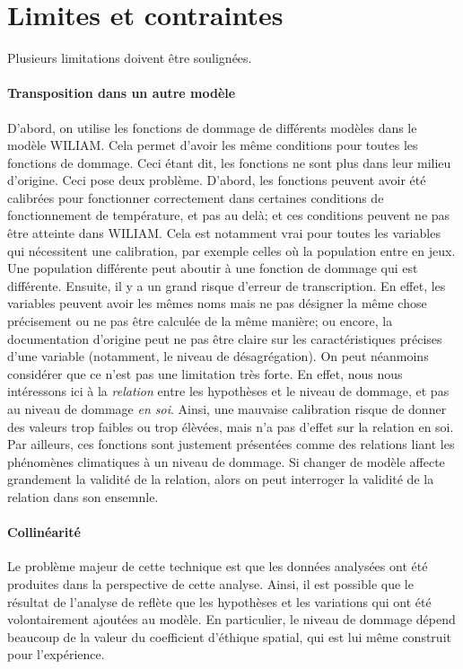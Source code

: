 \section{Limites et contraintes}

Plusieurs limitations doivent être soulignées. 

\paragraph{Transposition dans un autre modèle} D'abord, on utilise les fonctions de dommage de différents modèles dans le modèle WILIAM. Cela permet d'avoir les même conditions pour toutes les fonctions de dommage. Ceci étant dit, les fonctions ne sont plus dans leur milieu d'origine. Ceci pose deux problème. D'abord, les fonctions peuvent avoir été calibrées pour fonctionner correctement dans certaines conditions de fonctionnement de température, et pas au delà; et ces conditions peuvent ne pas être atteinte dans WILIAM. Cela est notamment vrai pour toutes les variables qui nécessitent une calibration, par exemple celles où la population entre en jeux. Une population différente peut aboutir à une fonction de dommage qui est différente. Ensuite, il y a un grand risque d'erreur de transcription. En effet, les variables peuvent avoir les mêmes noms mais ne pas désigner la même chose précisement ou ne pas être calculée de la même manière; ou encore, la documentation d'origine peut ne pas être claire sur les caractéristiques précises d'une variable (notamment, le niveau de désagrégation). On peut néanmoins considérer que ce n'est pas une limitation très forte. En effet, nous nous intéressons ici à la \emph{relation} entre les hypothèses et le niveau de dommage, et pas au niveau de dommage \emph{en soi}. Ainsi, une mauvaise calibration risque de donner des valeurs trop faibles ou trop élèvées, mais n'a pas d'effet sur la relation en soi. Par ailleurs, ces fonctions sont justement présentées comme des relations liant les phénomènes climatiques à un niveau de dommage. Si changer de modèle affecte grandement la validité de la relation, alors on peut interroger la validité de la relation dans son ensemnle. 

\paragraph{Collinéarité} Le problème majeur de cette technique est que les données analysées ont été produites dans la perspective de cette analyse. Ainsi, il est possible que le résultat de l'analyse de reflète que les hypothèses et les variations qui ont été volontairement ajoutées au modèle. En particulier, le niveau de dommage dépend beaucoup de la valeur du coefficient d'éthique spatial, qui est lui même construit pour l'expérience. 



